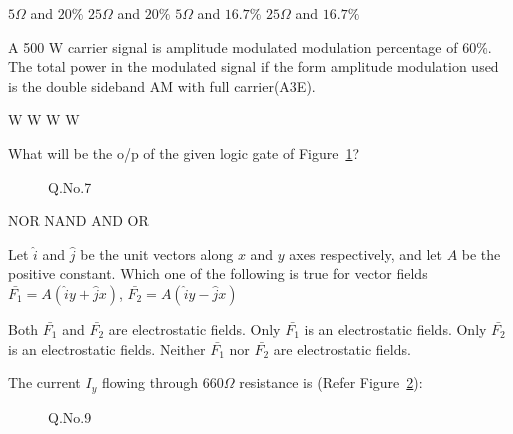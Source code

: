 \documentclass[a4, 12pt, addpoints]{exam}
\begin{document}
\begin{questions}
\begin{oneparchoices}
\choice $5 \Omega$ and $20 \%$ 
\choice $25 \Omega$ and $20 \%$
\choice $5 \Omega$ and $ 16.7 \%$
\choice $25 \Omega$ and $16.7 \%$
\end{oneparchoices} 
\question A 500 W carrier signal is amplitude modulated modulation percentage of 60\%.  The total power in the modulated signal if the form amplitude modulation used is  the double sideband AM with full carrier(A3E). \\[0.3cm]
 \begin{oneparchoices}
 W
 W
 W
 W
\end{oneparchoices} 
\question What will be the o/p of the given logic gate of Figure~\ref{lg}?
\begin{figure}[H]
\centering
{}
\caption{Q.No.7}
\label{lg}
\end{figure}
\begin{oneparchoices}
\choice NOR
\choice NAND
\choice AND
\choice OR
\end{oneparchoices} 
\question Let $\hat{i}$ and $\hat{j}$ be the unit vectors along $x$ and $y$ axes respectively, and let $A$ be the positive constant. Which one of the following is true for vector fields $ \bar{F_1} = A ( \hat{i} y + \hat{j} x ) $, $ \bar{F_2} = A ( \hat{i} y - \hat{j} x ) $  \\[0.3cm]
\begin{oneparchoices}
\choice Both $\bar{F_1}$ and $\bar{F_2}$ are electrostatic fields.
\choice Only $\bar{F_1}$ is an electrostatic fields.
\choice Only $\bar{F_2}$ is an electrostatic fields.
\choice Neither $\bar{F_1}$ nor $\bar{F_2}$ are electrostatic fields.
\end{oneparchoices} 
\question The current $I_y$ flowing through $660 \Omega$ resistance  is (Refer Figure~\ref{fig:1}):
\begin{figure}[H]
\centering
{}
\caption{Q.No.9}
\label{fig:1}
\end{figure}


\end{questions}
\end{document}
